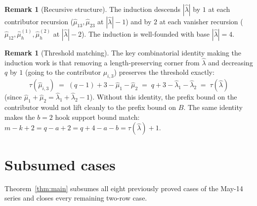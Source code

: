 \documentclass[11pt]{article}
\theoremstyle{definition}
\newtheorem{remark}[theorem]{Remark}
\newcommand{\hatl}{\widehat\lambda}
\newcommand{\hatm}{\widehat\mu}
\begin{document}
\begin{remark}[Recursive structure]\label{rem:recursion-structure}
The induction descends $|\hatl|$ by $1$ at each contributor recursion
($\hatm_{13}, \hatm_{23}$ at $|\hatl| - 1$) and by $2$ at each
vanisher recursion ($\hatm_{12}, \hatm_h^{(1)}, \hatm_h^{(2)}$ at
$|\hatl| - 2$).  The induction is well-founded with base $|\hatl| = 4$.
\end{remark}

\begin{remark}[Threshold matching]\label{rem:threshold-match}
The key combinatorial identity making the induction work is that
removing a length-preserving corner from $\hatl$ and decreasing
$q$ by $1$ (going to the contributor $\mu_{i,3}$) preserves the
threshold exactly:
\[
   \tau(\hatm_{i,3}) \;=\; (q-1) + 3 - \hatm_1 - \hatm_2
   \;=\; q + 3 - \hatl_1 - \hatl_2 \;=\; \tau(\hatl)
\]
(since $\hatm_1 + \hatm_2 = \hatl_1 + \hatl_2 - 1$).  Without this
identity, the prefix bound on the contributor would not lift cleanly
to the prefix bound on $B$.  The same identity makes the $b = 2$ hook
support bound match: $m - k + 2 = q - a + 2 = q + 4 - a - b
= \tau(\hatl) + 1$.
\end{remark}

\section{Subsumed cases}\label{sec:subsumed}

Theorem~\ref{thm:main} subsumes all eight previously proved cases of
the May-14 series and closes every remaining two-row case.
\end{document}
